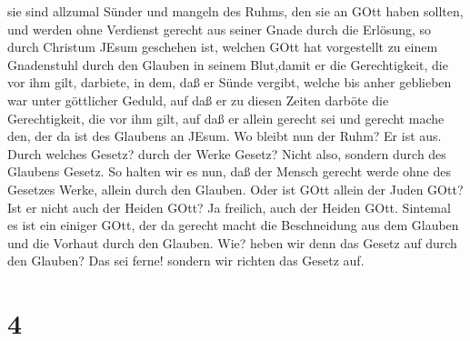 sie sind allzumal Sünder und mangeln des Ruhms, den sie an GOtt haben
sollten,  und werden ohne Verdienst gerecht aus seiner
Gnade durch die Erlösung, so durch Christum JEsum geschehen ist,
 welchen GOtt hat vorgestellt zu einem Gnadenstuhl durch
den Glauben in seinem Blut,damit er die Gerechtigkeit, die vor ihm gilt,
darbiete, in dem, daß er Sünde vergibt, welche bis anher geblieben war
unter göttlicher Geduld,  auf daß er zu diesen Zeiten
darböte die Gerechtigkeit, die vor ihm gilt, auf daß er allein gerecht
sei und gerecht mache den, der da ist des Glaubens an JEsum.
 Wo bleibt nun der Ruhm? Er ist aus. Durch welches Gesetz?
durch der Werke Gesetz? Nicht also, sondern durch des Glaubens Gesetz.
 So halten wir es nun, daß der Mensch gerecht werde ohne
des Gesetzes Werke, allein durch den Glauben.  Oder ist
GOtt allein der Juden GOtt? Ist er nicht auch der Heiden GOtt? Ja
freilich, auch der Heiden GOtt.  Sintemal es ist ein
einiger GOtt, der da gerecht macht die Beschneidung aus dem Glauben und
die Vorhaut durch den Glauben.  Wie? heben wir denn das
Gesetz auf durch den Glauben? Das sei ferne! sondern wir richten das
Gesetz auf.

\hypertarget{section-3}{%
\section{4}\label{section-3}}

